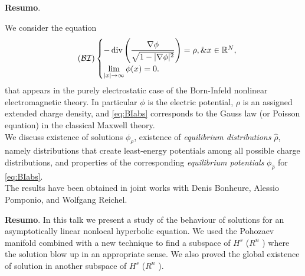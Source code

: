 	
	\noindent\textbf{Resumo}.\label{pa} 
	
	We consider the equation
	\begin{equation}\label{eq:BIabs}
		\tag{$\mathcal{BI}$}
		\begin{cases}
			-\operatorname{div}\left(\displaystyle\frac{\nabla
				\phi}{\sqrt{1-|\nabla \phi|^2}}\right)= \rho, \& x\in\mathbb{R}^N,
			\\
			\displaystyle\lim_{|x|\to \infty}\phi(x)= 0.
		\end{cases}
	\end{equation}
	that appears in the purely electrostatic case of the Born-Infeld nonlinear electromagnetic theory.
	In particular $\phi$ is the electric potential, $\rho$ is an assigned extended charge density, and \eqref{eq:BIabs} corresponds to the Gauss law (or Poisson equation) in the classical Maxwell theory.\\  
	We discuss existence of solutions $\phi_\rho$, existence of {\em equilibrium distributions} $\hat{\rho}$, namely distributions that create least-energy potentials among all possible charge distributions, and properties of the corresponding {\em equilibrium potentials} $\phi_{\hat{\rho}}$ for \eqref{eq:BIabs}.\\
	
	\vspace*{0.5cm} \noindent The results have been obtained in joint works with Denis Bonheure, Alessio Pomponio, and Wolfgang Reichel.
	
	
	\vspace{24pt}
	
	
	\noindent\textbf{Resumo}.\label{rl} 
	In this talk we present a study of  the behaviour of solutions for an asymptotically linear nonlocal hyperbolic equation. We used the Pohozaev manifold combined with a new technique to find a subspace of $H^s$ ($R^n$ ) where the solution blow up in an appropriate sense. We also proved the global existence of solution in another subspace of $H^s$ ($R^n$ ).
	
	\vspace{24pt}

